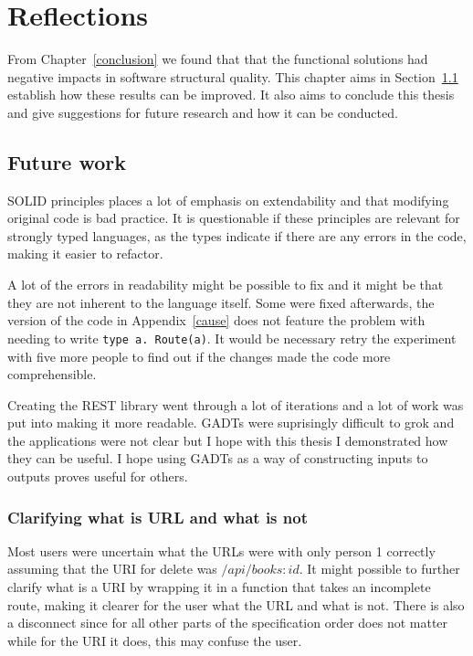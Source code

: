 \chapter{Reflections}\label{reflection}

From Chapter~\ref{conclusion} we found that that the functional solutions had
negative impacts in software structural quality. This chapter aims
in Section~\ref{futurework} establish how these results can be improved. It also
aims to conclude this thesis and give suggestions for future research and how it
can be conducted.

\section{Future work}\label{futurework}

SOLID principles places a lot of emphasis on extendability and that modifying
original code is bad practice. It is questionable if these principles are
relevant for strongly typed languages, as the types indicate if there are any
errors in the code, making it easier to refactor.

A lot of the errors in readability might be possible to fix and it might be that
they are not inherent to the language itself. Some were fixed afterwards, the
version of the code in Appendix~\ref{cause} does not feature the problem with
needing to write \texttt{type a. Route(a)}. It would be necessary  retry the
experiment with five more people to find out if the changes made the code more
comprehensible. 

Creating the REST library went through a lot of iterations and a lot of work was
put into making it more readable. GADTs were suprisingly difficult to grok and
the applications were not clear but I hope with this thesis I demonstrated how
they can be useful. I hope using GADTs as a way of constructing inputs to
outputs proves useful for others.

\subsection{Clarifying what is URL and what is not}

Most users were uncertain what the URLs were with only person 1 correctly
assuming that the URI for delete was $/api/books:id$. It might possible to
further clarify what is a URI by wrapping it in a function that takes an
incomplete route, making it clearer for the user what the URL and what is not.
There is also a disconnect since for all other parts of the specification order
does not matter while for the URI it does, this may confuse the user.

